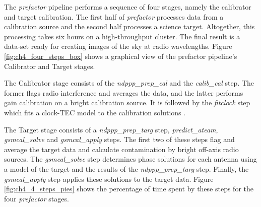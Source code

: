 The \textit{prefactor} pipeline performs a sequence of four stages, namely the calibrator and target calibration. The first half of \textit{prefactor} processes data from a calibration source and the second half processes a science target. Altogether, this processing takes six hours on a high-throughput cluster. The final result is a data-set ready for creating  images of the sky at radio wavelengths. Figure \ref{fig:ch4_four_steps_box} shows a graphical view of the prefactor pipeline's Calibrator and Target stages.


The Calibrator stage consists of the \textit{ndppp\_prep\_cal} and the \textit{calib\_cal} step. The former flags radio interference and averages the data, and the latter performs gain calibration on a bright calibration source. It is followed by the \textit{fitclock} step which fits a clock-TEC model to the calibration solutions \citep{lofar_prefactor}.  

The Target stage consists of a \textit{ndppp\_prep\_targ} step, \textit{predict\_ateam}, \textit{gsmcal\_solve} and \textit{gsmcal\_apply} steps. The first two of these steps flag and average the target data and calculate contamination by bright off-axis radio sources. The \textit{gsmcal\_solve} step determines phase solutions for each antenna using a model of the target and the results of the \textit{ndppp\_prep\_targ} step. Finally, the \textit{gsmcal\_apply} step applies these solutions to the target data. Figure \ref{fig:ch4_4_steps_pies} shows the percentage of time spent by these steps for the four \textit{prefactor} stages.

